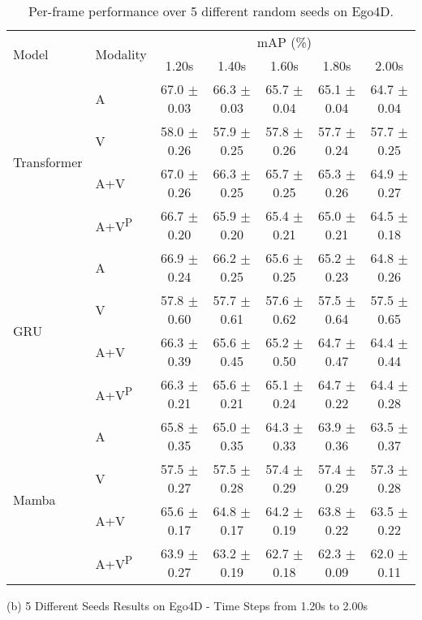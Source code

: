 \begin{table*}[t]
\begin{subtable}{\textwidth}
\centering
\begin{adjustbox}{width=\textwidth, center}
\begin{tabular}{llccccc}
\toprule
\multirow{2}{*}{Model} & \multirow{2}{*}{Modality} & \multicolumn{5}{c}{mAP (\%)} \\
\cmidrule(lr){3-7}
 & & 1.20s & 1.40s & 1.60s & 1.80s & 2.00s \\
\midrule
\multirow{4}{*}{\centering Transformer} 
 & A & 67.0 $\pm$ 0.03 & 66.3 $\pm$ 0.03 & 65.7 $\pm$ 0.04 & 65.1 $\pm$ 0.04 & 64.7 $\pm$ 0.04 
 \\
 & V & 58.0 $\pm$ 0.26 & 57.9 $\pm$ 0.25 & 57.8 $\pm$ 0.26 & 57.7 $\pm$ 0.24 & 57.7 $\pm$ 0.25 
 \\
 & A+V & 67.0 $\pm$ 0.26 & 66.3 $\pm$ 0.25 & 65.7 $\pm$ 0.25 & 65.3 $\pm$ 0.26 & 64.9 $\pm$ 0.27 
 \\
 & A+V\textsuperscript{P} & 66.7 $\pm$ 0.20 & 65.9 $\pm$ 0.20 & 65.4 $\pm$ 0.21 & 65.0 $\pm$ 0.21 & 64.5 $\pm$ 0.18 
\\
\midrule
\multirow{4}{*}{\centering GRU} 
 & A & 66.9 $\pm$ 0.24 & 66.2 $\pm$ 0.25 & 65.6 $\pm$ 0.25 & 65.2 $\pm$ 0.23 & 64.8 $\pm$ 0.26 
 \\
 & V & 57.8 $\pm$ 0.60 & 57.7 $\pm$ 0.61 & 57.6 $\pm$ 0.62 & 57.5 $\pm$ 0.64 & 57.5 $\pm$ 0.65 
 \\
 & A+V & 66.3 $\pm$ 0.39 & 65.6 $\pm$ 0.45 & 65.2 $\pm$ 0.50 & 64.7 $\pm$ 0.47 & 64.4 $\pm$ 0.44 
 \\
 & A+V\textsuperscript{P} & 66.3 $\pm$ 0.21 & 65.6 $\pm$ 0.21 & 65.1 $\pm$ 0.24 & 64.7 $\pm$ 0.22 & 64.4 $\pm$ 0.28 
 \\
\midrule
\multirow{4}{*}{\centering Mamba} 
 & A & 65.8 $\pm$ 0.35 & 65.0 $\pm$ 0.35 & 64.3 $\pm$ 0.33 & 63.9 $\pm$ 0.36 & 63.5 $\pm$ 0.37 
 \\
 & V & 57.5 $\pm$ 0.27 & 57.5 $\pm$ 0.28 & 57.4 $\pm$ 0.29 & 57.4 $\pm$ 0.29 & 57.3 $\pm$ 0.28 
 \\
 & A+V & 65.6 $\pm$ 0.17 & 64.8 $\pm$ 0.17 & 64.2 $\pm$ 0.19 & 63.8 $\pm$ 0.22 & 63.5 $\pm$ 0.22 
 \\
 & A+V\textsuperscript{P} & 63.9 $\pm$ 0.27 & 63.2 $\pm$ 0.19 & 62.7 $\pm$ 0.18 & 62.3 $\pm$ 0.09 & 62.0 $\pm$ 0.11 
 \\
\bottomrule
\end{tabular}
\end{adjustbox}
\label{tab:timesteps_different_seeds_Ego4D_b}
\caption*{(b) 5 Different Seeds Results on Ego4D - Time Steps from 1.20s to 2.00s}
\end{subtable}


\caption{Per-frame performance over 5 different random seeds on Ego4D.}

\label{tab:main_result_error_bar_ego4d}
\end{table*}
